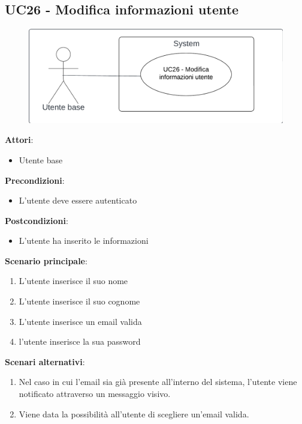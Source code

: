 \subsection{UC26 - Modifica informazioni utente}\label{usecase:26}
\begin{figure}[H]
\centering
\includegraphics[width=0.75\linewidth]{ucd/UCD26}
\end{figure}
\textbf{Attori}:
\begin{itemize}
    \item Utente base
\end{itemize}
\textbf{Precondizioni}:
\begin{itemize}
    \item L'utente deve essere autenticato
\end{itemize}
\textbf{Postcondizioni}:
\begin{itemize}
    \item L'utente ha inserito le informazioni
\end{itemize}
\textbf{Scenario principale}:
\begin{enumerate}
    \item L'utente inserisce il suo nome
    \item L'utente inserisce il suo cognome
    \item L'utente inserisce un email valida
    \item l'utente inserisce la sua password
\end{enumerate}
\textbf{Scenari alternativi}:
\begin{enumerate}
    \item Nel caso in cui l'email sia già presente all'interno del sistema, l'utente viene notificato attraverso un messaggio visivo.
    \item Viene data la possibilità all'utente di scegliere un'email valida.
\end{enumerate}
\newpage